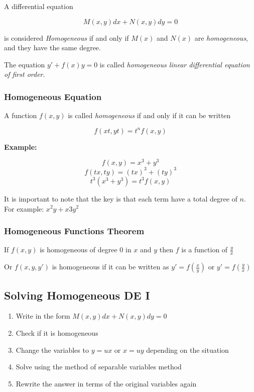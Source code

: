 A differential equation 

\[
    M(x,y)dx + N(x,y)dy = 0
\]

is considered \emph{Homogeneous} if and only if
\(M(x)\) and \(N(x)\) are \emph{homogeneous}, and they have the same degree.
\vspace{\baselineskip}

The equation \(y' + f(x)y = 0\) is called \emph{homogeneous linear differential equation of first order}.

\subsubsection{Homogeneous Equation}

A function \(f(x,y)\) is called \emph{homogeneous} if and only if it can be written

\[
    f(xt, yt) = t^n f(x,y)
\]

\textbf{Example: }

\[
    f(x,y) = x^3 + y^3
\]
\[
    f(tx, ty) = {(tx)}^3 + {(ty)}^3
\]
\[
    t^3 (x^3 + y^3) = t^3 f(x,y)
\]

It is important to note that the key is that each term have a total degree of \(n\).
For example: \(x^2y + x3y^2\)

\subsubsection{Homogeneous Functions Theorem}

If \(f(x,y)\) is homogeneous of degree \(0\) in \(x\) and \(y\) then 
\(f\) is a function of \(\frac{y}{x}\)

Or \(f(x,y,y')\) is homogeneous if it can be written as \(y' = f(\frac{x}{y})\) or \(y' = f(\frac{y}{x})\)

\subsection{Solving Homogeneous DE I}

\begin{enumerate}
    \item Write in the form \(M(x,y)dx + N(x,y)dy = 0\)
    \item Check if it is homogeneous
    \item Change the variables to \(y = ux\) or \(x = uy\) depending on the situation
    \item Solve using the method of separable variables method
    \item Rewrite the answer in terms of the original variables again
\end{enumerate}

